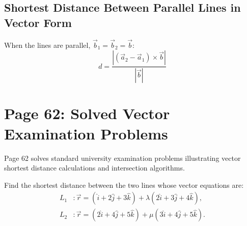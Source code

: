 \subsection{Shortest Distance Between Parallel Lines in Vector Form}
When the lines are parallel, $\vec{b}_1 = \vec{b}_2 = \vec{b}$:
\begin{equation}
    \boxed{d = \frac{|(\vec{a}_2 - \vec{a}_1) \times \vec{b}|}{|\vec{b}|}}
\end{equation}

\section{Page 62: Solved Vector Examination Problems}
\label{sec:page62}

\begin{conceptbox}
Page 62 solves standard university examination problems illustrating vector shortest distance calculations and intersection algorithms.
\end{conceptbox}

\begin{examplebox}
Find the shortest distance between the two lines whose vector equations are:
\begin{align}
    L_1 &: \vec{r} = (\hat{i} + 2\hat{j} + 3\hat{k}) + \lambda(2\hat{i} + 3\hat{j} + 4\hat{k}), \\
    L_2 &: \vec{r} = (2\hat{i} + 4\hat{j} + 5\hat{k}) + \mu(3\hat{i} + 4\hat{j} + 5\hat{k}).
\end{align}
\end{examplebox}

